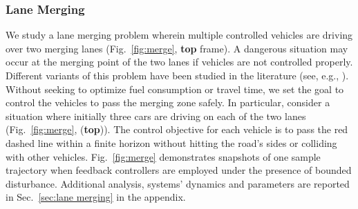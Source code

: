 \subsubsection{Lane Merging}
\label{subsec:lane merging}
We study a lane merging problem wherein multiple 
controlled vehicles are driving over two merging lanes (Fig.~\ref{fig:merge}, \textbf{top} frame). 
A dangerous situation may occur at the merging point of the two lanes if vehicles are not controlled properly. 
Different variants of this problem have been studied in the literature (see, e.g., \cite{xiao2019merging,xiao2020merging}). Without seeking to optimize fuel consumption or travel time, we set the goal to control the vehicles to pass the merging zone safely. In particular, consider a situation where initially three cars are driving on each of the two lanes (Fig.~\ref{fig:merge}, (\textbf{top})). The control objective for each vehicle is to pass the red dashed line within a finite horizon without hitting the road's sides or colliding with other vehicles. Fig.~\ref{fig:merge} demonstrates snapshots of one sample trajectory when feedback controllers are employed under the presence of bounded disturbance. Additional analysis, systems' dynamics and parameters are reported in Sec.~\ref{sec:lane merging} in the appendix.
